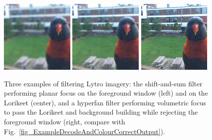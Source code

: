 \documentclass[onecolumn]{article}
\begin{document}
\begin{figure}
	\centering
	\includegraphics[width=0.32\textwidth]{Figs/Sample2_ShiftSumWindow}
	\includegraphics[width=0.32\textwidth]{Figs/Sample2_ShiftSumLorikeet}
	\includegraphics[width=0.32\textwidth]{Figs/Sample2_HyperfanNoWindow}
	\caption{Three examples of filtering Lytro imagery: the shift-and-sum filter performing planar focus on the foreground window (left) and on the Lorikeet (center), and a hyperfan filter performing volumetric focus to pass the Lorikeet and background building while rejecting the foreground window (right, compare with Fig.~\ref{fig_ExampleDecodeAndColourCorrectOutput}).}
	\label{fig_ExampleFilterOutputLytro}
\end{figure}
\end{document}
